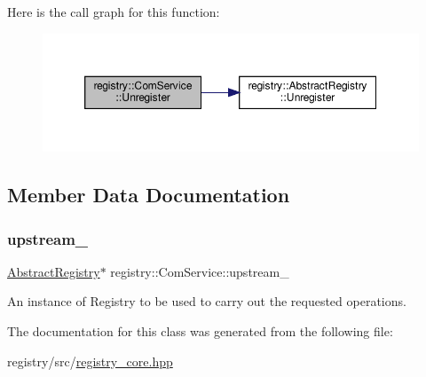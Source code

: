 Here is the call graph for this function\+:\nopagebreak
\begin{figure}[H]
\begin{center}
\leavevmode
\includegraphics[width=350pt]{classregistry_1_1ComService_a6a64c38b8adf4443f387af7ed786245c_cgraph}
\end{center}
\end{figure}


\subsection{Member Data Documentation}
\mbox{\label{classregistry_1_1ComService_a308106b15416761e61709d608f10d726}} 
\subsubsection{\texorpdfstring{upstream\+\_\+}{upstream\_}}
{\footnotesize\ttfamily \hyperlink{classregistry_1_1AbstractRegistry}{Abstract\+Registry}$\ast$ registry\+::\+Com\+Service\+::upstream\+\_\+\hspace{0.3cm}{\ttfamily [private]}}



An instance of Registry to be used to carry out the requested operations. 



The documentation for this class was generated from the following file\+:\begin{DoxyCompactItemize}
\item 
registry/src/\hyperlink{registry__core_8hpp}{registry\+\_\+core.\+hpp}\end{DoxyCompactItemize}
